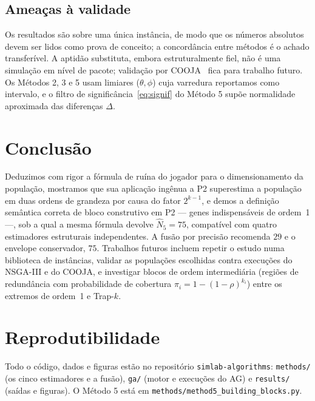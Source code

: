 \documentclass[conference]{IEEEtran}
\newcommand{\Nhat}{\hat{N}}
\begin{document}
\subsection{Ameaças à validade}
Os resultados são sobre uma única instância, de modo que os números absolutos devem
ser lidos como prova de conceito; a concordância entre métodos é o achado
transferível. A aptidão substituta, embora estruturalmente fiel, não é uma
simulação em nível de pacote; validação por COOJA~\cite{osterlind2006cooja} fica
para trabalho futuro. Os Métodos 2, 3 e 5 usam limiares ($\theta,\phi$) cuja
varredura reportamos como intervalo, e o filtro de significância~\eqref{eq:signif}
do Método 5 supõe normalidade aproximada das diferenças $\Delta$.

\section{Conclusão}
\label{sec:conclusao}
Deduzimos com rigor a fórmula de ruína do jogador para o dimensionamento da
população, mostramos que sua aplicação ingênua a P2 superestima a população em duas
ordens de grandeza por causa do fator $2^{k-1}$, e demos a definição semântica
correta de bloco construtivo em P2 --- genes indispensáveis de ordem~1 ---, sob a
qual a mesma fórmula devolve $\Nhat_5=75$, compatível com quatro estimadores
estruturais independentes. A fusão por precisão recomenda $29$ e o envelope
conservador, $75$. Trabalhos futuros incluem repetir o estudo numa biblioteca de
instâncias, validar as populações escolhidas contra execuções do NSGA-III e do
COOJA, e investigar blocos de ordem intermediária (regiões de redundância com
probabilidade de cobertura $\pi_i=1-(1-\rho)^{k_i}$) entre os extremos de ordem~1 e
Trap-$k$.

\section*{Reprodutibilidade}
Todo o código, dados e figuras estão no repositório \texttt{simlab-algorithms}:
\texttt{methods/} (os cinco estimadores e a fusão), \texttt{ga/} (motor e execuções
do AG) e \texttt{results/} (saídas e figuras). O Método 5 está em
\texttt{methods/method5\_building\_blocks.py}.



\end{document}
